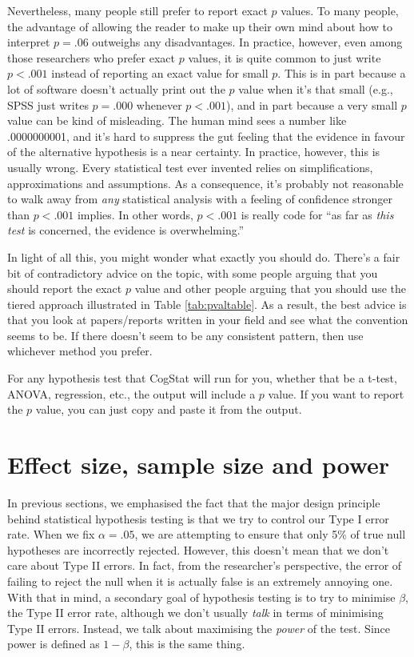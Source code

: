 \documentclass[
  11pt,
  a4paper,
  twoside,symmetric,openright]{book}
\theoremstyle{break}
\theoremstyle{break}
\begin{document}
Nevertheless, many people still prefer to report exact \(p\) values. To many people, the advantage of allowing the reader to make up their own mind about how to interpret \(p = .06\) outweighs any disadvantages. In practice, however, even among those researchers who prefer exact \(p\) values, it is quite common to just write \(p<.001\) instead of reporting an exact value for small \(p\). This is in part because a lot of software doesn't actually print out the \(p\) value when it's that small (e.g., SPSS just writes \(p = .000\) whenever \(p<.001\)), and in part because a very small \(p\) value can be kind of misleading. The human mind sees a number like .0000000001, and it's hard to suppress the gut feeling that the evidence in favour of the alternative hypothesis is a near certainty. In practice, however, this is usually wrong. Every statistical test ever invented relies on simplifications, approximations and assumptions. As a consequence, it's probably not reasonable to walk away from \emph{any} statistical analysis with a feeling of confidence stronger than \(p<.001\) implies. In other words, \(p<.001\) is really code for ``as far as \emph{this test} is concerned, the evidence is overwhelming.''

In light of all this, you might wonder what exactly you should do. There's a fair bit of contradictory advice on the topic, with some people arguing that you should report the exact \(p\) value and other people arguing that you should use the tiered approach illustrated in Table \ref{tab:pvaltable}. As a result, the best advice is that you look at papers/reports written in your field and see what the convention seems to be. If there doesn't seem to be any consistent pattern, then use whichever method you prefer.

For any hypothesis test that CogStat will run for you, whether that be a t-test, ANOVA, regression, etc., the output will include a \(p\) value. If you want to report the \(p\) value, you can just copy and paste it from the output.

\section{Effect size, sample size and power}\label{effectsize}

In previous sections, we emphasised the fact that the major design principle behind statistical hypothesis testing is that we try to control our Type I error rate. When we fix \(\alpha = .05\), we are attempting to ensure that only 5\% of true null hypotheses are incorrectly rejected. However, this doesn't mean that we don't care about Type II errors. In fact, from the researcher's perspective, the error of failing to reject the null when it is actually false is an extremely annoying one. With that in mind, a secondary goal of hypothesis testing is to try to minimise \(\beta\), the Type II error rate, although we don't usually \emph{talk} in terms of minimising Type II errors. Instead, we talk about maximising the \emph{power} of the test. Since power is defined as \(1-\beta\), this is the same thing.
\end{document}
